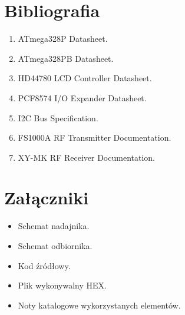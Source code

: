 \documentclass[a4paper,12pt]{article}
\begin{document}
\section{Bibliografia}

\begin{enumerate}
\item ATmega328P Datasheet.
\item ATmega328PB Datasheet.
\item HD44780 LCD Controller Datasheet.
\item PCF8574 I/O Expander Datasheet.
\item I2C Bus Specification.
\item FS1000A RF Transmitter Documentation.
\item XY-MK RF Receiver Documentation.
\end{enumerate}

\section{Załączniki}

\begin{itemize}
\item Schemat nadajnika.
\item Schemat odbiornika.
\item Kod źródłowy.
\item Plik wykonywalny HEX.
\item Noty katalogowe wykorzystanych elementów.
\end{itemize}
\end{document}
